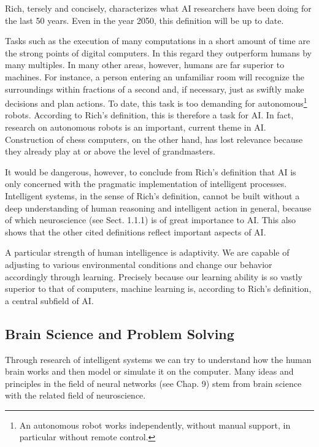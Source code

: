 \documentclass[10pt]{book}
\begin{document}
Rich, tersely and concisely, characterizes what AI researchers have been doing for the last 50 years. Even in the year 2050, this definition will be up to date.

Tasks such as the execution of many computations in a short amount of time are the strong points of digital computers. In this regard they outperform humans by many multiples. In many other areas, however, humans are far superior to machines. For instance, a person entering an unfamiliar room will recognize the surroundings within fractions of a second and, if necessary, just as swiftly make decisions and plan actions. To date, this task is too demanding for autonomous\footnote{An autonomous robot works independently, without manual support, in particular without remote control.} robots. According to Rich's definition, this is therefore a task for AI. In fact, research on autonomous robots is an important, current theme in AI. Construction of chess computers, on the other hand, has lost relevance because they already play at or above the level of grandmasters.

It would be dangerous, however, to conclude from Rich's definition that AI is only concerned with the pragmatic implementation of intelligent processes. Intelligent systems, in the sense of Rich's definition, cannot be built without a deep understanding of human reasoning and intelligent action in general, because of which neuroscience (see Sect. 1.1.1) is of great importance to AI. This also shows that the other cited definitions reflect important aspects of AI.

A particular strength of human intelligence is adaptivity. We are capable of adjusting to various environmental conditions and change our behavior accordingly through learning. Precisely because our learning ability is so vastly superior to that of computers, machine learning is, according to Rich's definition, a central subfield of AI.

\subsection{Brain Science and Problem Solving}
Through research of intelligent systems we can try to understand how the human brain works and then model or simulate it on the computer. Many ideas and principles in the field of neural networks (see Chap. 9) stem from brain science with the related field of neuroscience.
\end{document}
